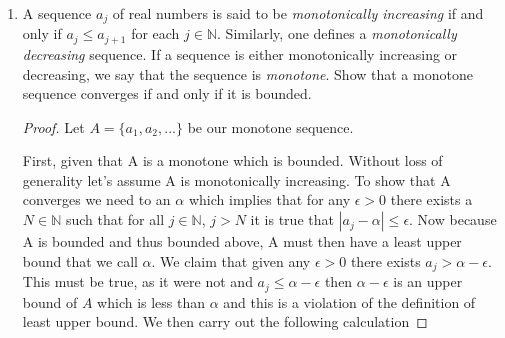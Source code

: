 \documentclass[11pt, leqno]{article}
\begin{document}
\begin{enumerate}
	\begin{proof}
	We first consider the set $ A = \{a_{j} | j \in \mathbb{N}\}$. For any $a_{i}$, $b_{j}$, we know that $a_{i} \leq b_{j}$. There are two cases, first if $a_{i} \leq a_{j}$ because $a_{j} \leq b_{j}$, we know also  $a_{i} \leq b_{j}$. Secondly, if $a_{j} \leq a_{i}$, then also $b_{i} \leq b_{j}$, thus because $a_{i} \leq b_{i}$ it follows that $a_{i} \leq b_{j}$. Hence, for any $a_{i}$, $b_{j}$, $a_{i} \leq b_{j}$. Thus, it follows that any $b_{j}$ is an upper bound of $A$. As $A$ is bounded above, there must exist a $sup(A)$ that we denote $\alpha$. We know that, by definition, $\alpha \geq a_{j}$ for all $j \in \mathbb{N}\}$. However, we also know that $\alpha \leq b_{j}$, as $b_{j}$ is an upper bound and $\alpha$ is the least upper bound. Thus, we can write
	\[
		a_{j} \leq \alpha \leq b_{j}
	\]
	Thus the interval $(a_{j}, b_{j})$ for any $j \in \mathbb{N}\}$ must have at least one element. Also, because $I_{j+i} \subseteq I_j$, all $(a_{i}, b_{i}$ for $i < j$ will also have the interval $(a_{j}, b_{j})$ as a subset. Hence, the $\cap_{j \in \mathbb{N}}I_{j} \neq \emptyset$.
	
	Continuing with this line of reasoning. We want to show that as $\delta_{j} \xrightarrow{} 0$ and $j \xrightarrow{} \infty$, $\cap_{j \in \mathbb{N}}I_{j}$ has only one element. This is of course the case because as $\delta_{j} \xrightarrow{} 0$, we get that $a = b$, thus
	\[
		a_{j} \leq \alpha \leq b_{j}
	\]
	Simplifies to
	\[
		a_{j} = \alpha = b_{j}
	\]
	Thus, we have only one element in the intersection $\cap_{j \in \mathbb{N}}I_{j}$.
	\end{proof}
	
	\item
	 A sequence ${a_{j}}$ of real numbers is said to be \textit{monotonically increasing} if and only if $a_{j} \leq a_{j+1}$ for each $j \in \mathbb{N}$. Similarly, one defines a \textit{monotonically decreasing} sequence. If a sequence is either monotonically increasing or decreasing, we say that the sequence is \textit{monotone}. Show that a monotone sequence converges if and only if it is bounded.
	 
	 \begin{proof}
	 Let $A = \{a_{1}, a_{2},...\}$ be our monotone sequence.
	 
	 First, given that A is a monotone which is bounded. Without loss of generality let's assume A is monotonically increasing. To show that A converges we need to an $\alpha$ which implies that for any $\epsilon > 0$ there exists a $N \in \mathbb{N}$ such that for all $j \in \mathbb{N}$, $j > N$ it is true that $| a_{j} - \alpha | \leq \epsilon$. Now because A is bounded and thus bounded above, A must then have a least upper bound that we call $\alpha$. We claim that given any $\epsilon > 0$ there exists $a_{j} > \alpha - \epsilon$. This must be true, as it were not and $a_{j} \leq \alpha - \epsilon$ then $\alpha - \epsilon$ is an upper bound of $A$ which is less than $\alpha$ and this is a violation of the definition of least upper bound. We then carry out the following calculation
	 

\end{proof}
\end{enumerate}
\end{document}
